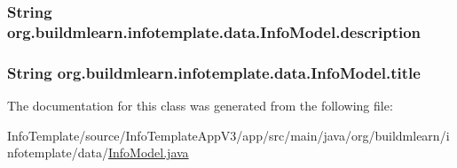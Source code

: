 \subsubsection[{\texorpdfstring{description}{description}}]{\setlength{\rightskip}{0pt plus 5cm}String org.\+buildmlearn.\+infotemplate.\+data.\+Info\+Model.\+description\hspace{0.3cm}{\ttfamily [private]}}\hypertarget{classorg_1_1buildmlearn_1_1infotemplate_1_1data_1_1InfoModel_ab9cc5ca5d5a76e595fbf540f2814d4bc}{}\label{classorg_1_1buildmlearn_1_1infotemplate_1_1data_1_1InfoModel_ab9cc5ca5d5a76e595fbf540f2814d4bc}
\subsubsection[{\texorpdfstring{title}{title}}]{\setlength{\rightskip}{0pt plus 5cm}String org.\+buildmlearn.\+infotemplate.\+data.\+Info\+Model.\+title\hspace{0.3cm}{\ttfamily [private]}}\hypertarget{classorg_1_1buildmlearn_1_1infotemplate_1_1data_1_1InfoModel_a327aa17add320405e34960aadc6fed42}{}\label{classorg_1_1buildmlearn_1_1infotemplate_1_1data_1_1InfoModel_a327aa17add320405e34960aadc6fed42}


The documentation for this class was generated from the following file\+:\begin{DoxyCompactItemize}
\item 
Info\+Template/source/\+Info\+Template\+App\+V3/app/src/main/java/org/buildmlearn/infotemplate/data/\hyperlink{InfoModel_8java}{Info\+Model.\+java}\end{DoxyCompactItemize}
